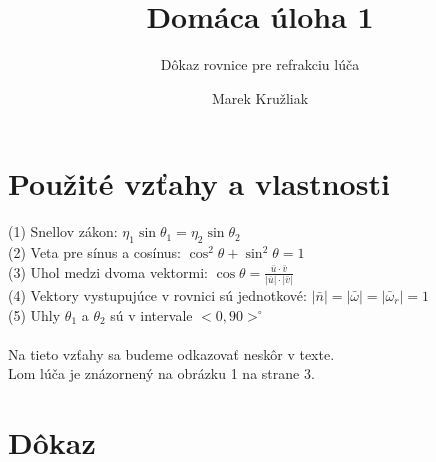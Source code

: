 \documentclass[slovak]{scrartcl}
\title{Domáca úloha 1}
\subtitle{Dôkaz rovnice pre refrakciu lúča}
\author{Marek Kružliak}
\begin{document}
\maketitle

\section{Použité vzťahy a vlastnosti}

(1) Snellov zákon: $\eta_{1} \sin\theta_{1} = \eta_{2} \sin\theta_{2}$\\
(2) Veta pre sínus a cosínus: $\cos^{2}\theta + \sin^{2}\theta = 1$\\
(3) Uhol medzi dvoma vektormi: $ \cos\theta = \frac{\bar{u}\cdot\bar{v}}{|\bar{u}|\cdot|\bar{v}|}$\\
(4) Vektory vystupujúce v rovnici sú jednotkové: $|\bar{n}| = |\bar{\omega}| = |\bar{\omega}_{r}| = 1$\\ 
(5) Uhly $\theta_{1}$ a $\theta_{2}$ sú v intervale $<0,90>^{\circ} $\\
\\
Na tieto vzťahy sa budeme odkazovať neskôr v texte. \\
Lom lúča je znázornený na obrázku 1 na strane 3.

\section{Dôkaz}
\end{document}
